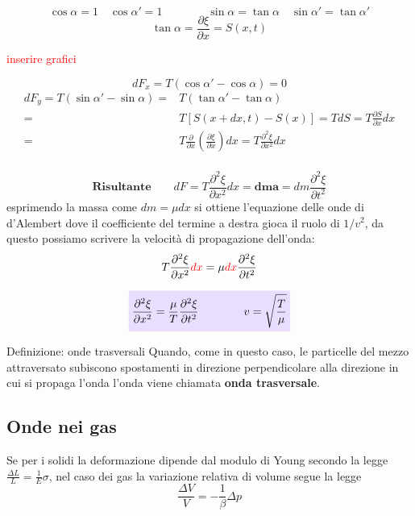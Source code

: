 \documentclass[x11names]{report}
\newcommand{\viola}[1]{\colorbox{yred}{$\displaystyle #1$}}
\begin{document}
	\[ 
	\cos{\alpha} = 1 \quad \cos{\alpha'} = 1 \qquad \qquad \sin{\alpha} = \tan{\alpha} \quad \sin{\alpha'} = \tan{\alpha'}
	\]
	\[ 
	\boxed{\tan\alpha = \frac{\partial \xi}{\partial x} = S(x,t)}
	\]
	
	\begin{center}
		\textcolor{red}{inserire grafici}
	\end{center}
	
	
	\[ 
	dF_x = T(\cos\alpha' - \cos\alpha ) = 0 
	\]
	\begin{align*}
		dF_y = T(\sin\alpha' - \sin\alpha ) =& T(\tan\alpha' - \tan\alpha )\\
		=& T\left[S(x+dx,t) - S(x)\right] = TdS = T\frac{\partial S}{\partial x}dx \\
		=& T\frac{\partial}{\partial x}\left(\frac{\partial \xi}{\partial x}\right)dx =  T\frac{\partial^2 \xi}{\partial x^2}dx\\
	\end{align*}
	
	\[ 
	\textbf{Risultante} \qquad	dF =  T\frac{\partial^2 \xi}{\partial x^2}dx  \mathbf{= dm a} = dm \frac{\partial^2 \xi}{\partial t^2} 
	\]
	esprimendo la massa come \(dm = \mu dx\) si ottiene l'equazione delle onde di d'Alembert dove il coefficiente del termine a destra gioca il ruolo di \(1/v^2\), da questo possiamo scrivere la velocità di propagazione dell'onda:
	\[ 
	T\frac{\partial^2\xi}{\partial x^2}\textcolor{red}{dx} = \mu \textcolor{red}{dx} \frac{\partial^2 \xi}{\partial t^2}
	\]
	
	\begin{equation}\label{corda}
		\viola{	\frac{\partial^2\xi}{\partial x^2} = \frac{\mu}{T} \frac{\partial^2 \xi}{\partial t^2} \qquad \qquad v = \sqrt{\frac{T}{\mu}}}
	\end{equation}
	
	\begin{center}
		\colorbox{yblue}{\begin{minipage}{5.75in}
				\begin{blues}{Definizione: onde trasversali}
					Quando, come in questo caso, le particelle del mezzo attraversato subiscono spostamenti in direzione perpendicolare alla direzione in cui si propaga l'onda l'onda viene chiamata \textbf{onda trasversale}.
				\end{blues}
		\end{minipage}}
	\end{center}
	
	\newpage
	\subsection{Onde nei gas}
	Se per i solidi la deformazione dipende dal modulo di Young secondo la legge \(\frac{\Delta L}{L} = \frac{1}{E}\sigma\), nel caso dei gas la variazione relativa di volume segue la legge
	\[ 
	\frac{\Delta V}{V} = -\frac{1}{\beta} \Delta p
	\] \\
	
\end{document}
